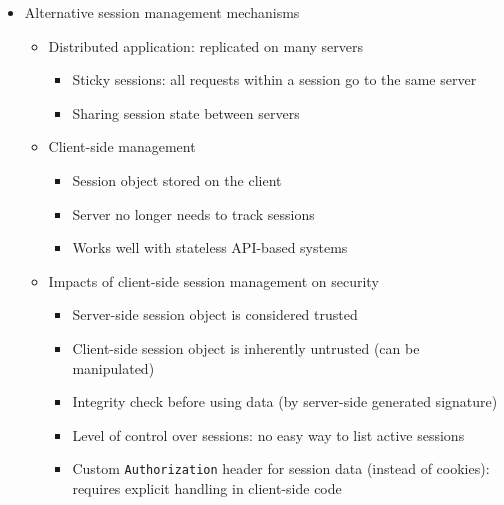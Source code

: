 \documentclass[12pt,titlepage,a4paper]{report}
\begin{document}
\begin{itemize}
 		\item Alternative session management mechanisms
 		\begin{itemize}
 			\item Distributed application: replicated on many servers
 			\begin{itemize}
 				\item Sticky sessions: all requests within a session go to the same server
 				\item Sharing session state between servers
 			\end{itemize}
	 		\item Client-side management
	 		\begin{itemize}
	 			\item Session object stored on the client
	 			\item Server no longer needs to track sessions
	 			\item Works well with stateless API-based systems
	 		\end{itemize}
 			\item Impacts of client-side session management on security
 			\begin{itemize}
 				\item Server-side session object is considered trusted
 				\item Client-side session object is inherently untrusted (can be manipulated)
 				\item Integrity check before using data (by server-side generated signature)
 				\item Level of control over sessions: no easy way to list active sessions
 				\item Custom \texttt{Authorization} header for session data (instead of cookies): requires explicit handling in client-side code
 			\end{itemize}
 		\end{itemize}
 	\end{itemize}
	
\end{document}
